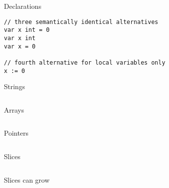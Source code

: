 \documentclass[10pt]{beamer}
\begin{document}
	
	\begin{frame}[t,fragile]{Declarations}
		\begin{verbatim}
// three semantically identical alternatives
var x int = 0
var x int
var x = 0

// fourth alternative for local variables only
x := 0
		\end{verbatim}
	\end{frame}

	
	\begin{frame}[t,fragile]{Strings}
		\inputminted{go}{code/02_strings.go}
	\end{frame}

	
	\begin{frame}[t,fragile]{Arrays}
		\inputminted{go}{code/03_arrays.go}
	\end{frame}

	
	\begin{frame}[t,fragile]{Pointers}
		\inputminted{go}{code/04_pointers.go}
	\end{frame}
	
	
	\begin{frame}[t,fragile]{Slices}
		\inputminted{go}{code/05_slices.go}
	\end{frame}
	
	
	\begin{frame}[t,fragile]{Slices can grow}
		\inputminted{go}{code/06_sieve.go}
	\end{frame}
	
	
\end{document}
